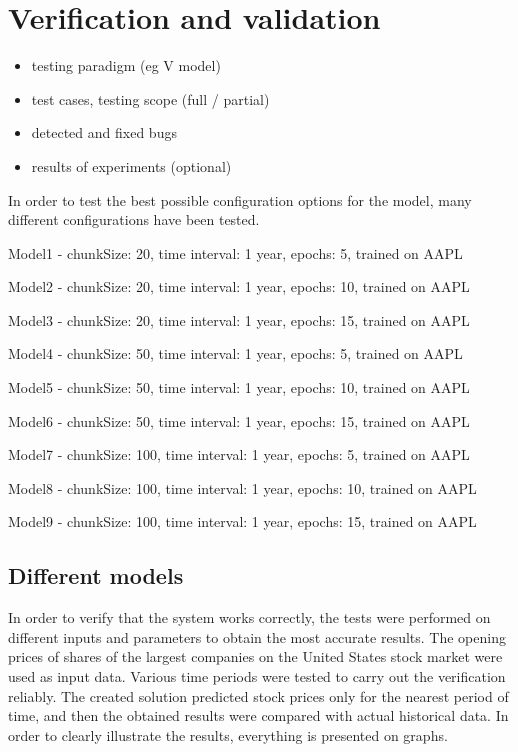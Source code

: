\chapter{Verification and validation}
\begin{itemize}
\item testing paradigm (eg V model)
\item test cases, testing scope (full / partial)
\item detected and fixed bugs
\item results of experiments (optional)
\end{itemize}

In order to test the best possible configuration options for the model, many different configurations have been tested.
\par
\bigskip
Model1 - chunkSize: 20, time interval: 1 year, epochs: 5, trained on AAPL\par
Model2 - chunkSize: 20, time interval: 1 year, epochs: 10, trained on AAPL\par
Model3 - chunkSize: 20, time interval: 1 year, epochs: 15, trained on AAPL\par
\par
\bigskip
Model4 - chunkSize: 50, time interval: 1 year, epochs: 5, trained on AAPL\par
Model5 - chunkSize: 50, time interval: 1 year, epochs: 10, trained on AAPL\par
Model6 - chunkSize: 50, time interval: 1 year, epochs: 15, trained on AAPL\par
\par
\bigskip
Model7 - chunkSize: 100, time interval: 1 year, epochs: 5, trained on AAPL\par
Model8 - chunkSize: 100, time interval: 1 year, epochs: 10, trained on AAPL\par
Model9 - chunkSize: 100, time interval: 1 year, epochs: 15, trained on AAPL\par
\par
\bigskip

\section{Different models}

In order to verify that the system works correctly, the tests were performed on different inputs and parameters to obtain the most accurate results. The opening prices of shares of the largest companies on the United States stock market were used as input data. Various time periods were tested to carry out the verification reliably. The created solution predicted stock prices only for the nearest period of time, and then the obtained results were compared with actual historical data. In order to clearly illustrate the results, everything is presented on graphs.

